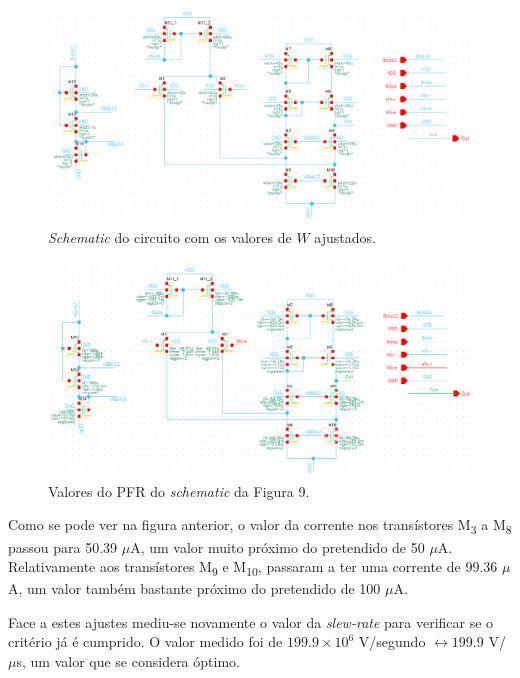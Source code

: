 \documentclass[11pt]{article}
\numberwithin{equation}{section}
\begin{document}
\begin{figure}[H]
	\centering
	\includegraphics[keepaspectratio=true, scale=0.70]{exps/Wajustados}
	\vspace{-0.5em}
	\caption{\textit{Schematic} do circuito com os valores de $W$ ajustados.}
	\label{fig:ajustefail}
	\vspace{-0.8em}
\end{figure}

\begin{figure}[H]
	\centering
	\includegraphics[keepaspectratio=true, scale=0.85]{exps/PFRajustados}
	\vspace{-0.5em}
	\caption{Valores do PFR do \textit{schematic} da Figura 9.}
	\vspace{-0.8em}
\end{figure}

Como se pode ver na figura anterior, o valor da corrente nos transístores M\textsubscript{3} a M\textsubscript{8} passou para 50.39 $\mu$A, um valor muito próximo do pretendido de 50 $\mu$A. Relativamente aos transístores M\textsubscript{9} e M\textsubscript{10}, passaram a ter uma corrente de 99.36 $\mu$A, um valor também bastante próximo do pretendido de 100 $\mu$A.

Face a estes ajustes mediu-se novamente o valor da \textit{slew-rate} para verificar se o critério já é cumprido. O valor medido foi de $199.9\times10^6$ V/segundo $\leftrightarrow 199.9$ V/$\mu$s, um valor que se considera óptimo.
\end{document}
